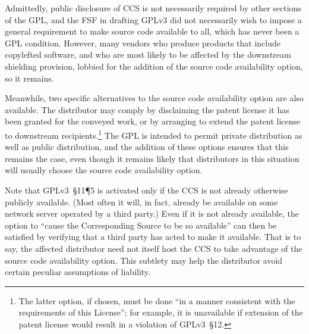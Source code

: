 Admittedly, public disclosure of CCS is not necessarily required by other
sections of the GPL, and the FSF in drafting GPLv3 did not necessarily wish
to impose a general requirement to make source code available to all, which
has never been a GPL condition.  However, many vendors who produce products
that include copylefted software, and who are most likely to be affected by the
downstream shielding provision, lobbied for the addition of the source code
availability option, so it remains.




Meanwhile, two specific alternatives to the source code availability option
are also available. The distributor may comply by disclaiming the patent
license it has been granted for the conveyed work, or by arranging to extend
the patent license to downstream recipients.\footnote{The latter option, if
  chosen, must be done ``in a manner consistent with the requirements of this
  License''; for example, it is unavailable if extension of the patent
  license would result in a violation of GPLv3~\S 12.}  The GPL is intended
to permit private distribution as well as public distribution, and the
addition of these options ensures that this remains the case, even though it
remains likely that distributors in this situation will usually choose the
source code availability option.

Note that GPLv3~\S11\P5 is activated only if the CCS is not already otherwise
publicly available.  (Most often it will, in fact, already be available on
some network server operated by a third party.)  Even if it is not already
available, the option to ``cause the Corresponding Source to be so
available'' can then be satisfied by verifying that a third party has acted
to make it available.  That is to say, the affected distributor need not
itself host the CCS to take advantage of the source code availability option.
This subtlety may help the distributor avoid certain peculiar assumptions of
liability.

